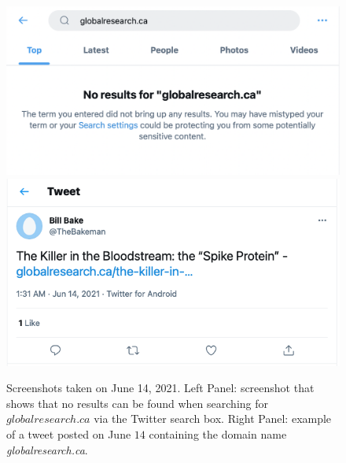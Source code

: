 \documentclass{article}
\begin{document}
\begin{figure}[h]
	\centering
					\includegraphics[scale=0.35]{./img/globalresearch_14_06_2021_16pm_UTC.png} 
					\includegraphics[scale=0.32]{./img/globalresearch/tweet.png} 
		\caption{Screenshots taken on June 14, 2021. Left Panel: screenshot that shows that no results can be found when searching for $globalresearch.ca$ via the Twitter search box. Right Panel: example of a tweet posted on June $14$ containing the domain name {\it globalresearch.ca}. }
		\label{fig3}
\end{figure}
\end{document}
